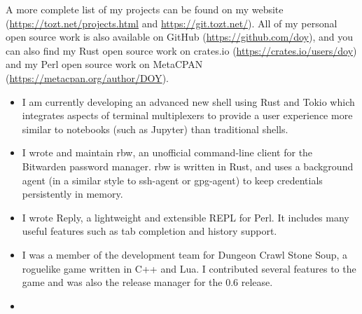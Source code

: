 \documentclass[letterpaper]{article}
\begin{document}
\small{A more complete list of my projects can be found on my website
(\url{https://tozt.net/projects.html} and \url{https://git.tozt.net/}). All of
my personal open source work is also available on GitHub
(\url{https://github.com/doy}), and you can also find my Rust open source work
on crates.io (\url{https://crates.io/users/doy}) and my Perl open source work
on MetaCPAN (\url{https://metacpan.org/author/DOY}).}\normalsize

\begin{itemize}
    \item {} \linebreak \linebreak
        I am currently developing an advanced new shell using Rust and Tokio
        which integrates aspects of terminal multiplexers to provide a user
        experience more similar to notebooks (such as Jupyter) than traditional
        shells.
    \item {} \linebreak \linebreak
        I wrote and maintain rbw, an unofficial command-line client for the
        Bitwarden password manager. rbw is written in Rust, and uses a
        background agent (in a similar style to ssh-agent or gpg-agent) to keep
        credentials persistently in memory.
    \item {} \linebreak \linebreak
        I wrote Reply, a lightweight and extensible REPL for Perl. It includes
        many useful features such as tab completion and history support.
    \item {} \linebreak \linebreak
        I was a member of the development team for Dungeon Crawl Stone Soup, a
        roguelike game written in C++ and Lua. I contributed several features
        to the game and was also the release manager for the 0.6 release.
    \item {} \linebreak \linebreak

\end{itemize}
\end{document}
